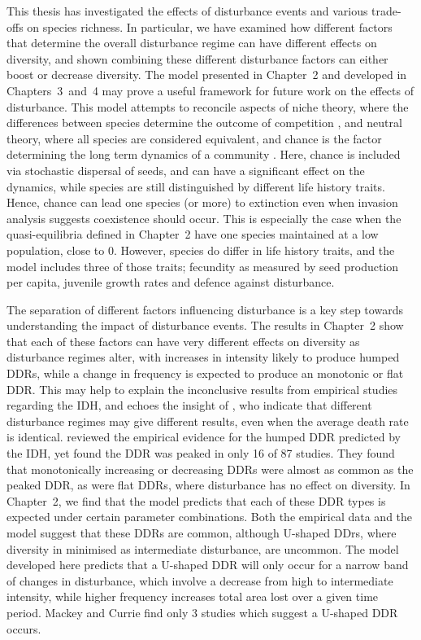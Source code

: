 This thesis has investigated the effects of disturbance events and various trade-offs on species richness. In particular, we have examined  how different factors that determine the overall disturbance regime can have different effects on diversity, and shown combining these different disturbance factors can either boost or decrease diversity. The model presented in Chapter~2 and developed in Chapters~3~and~4 may prove a useful framework for future work on the effects of disturbance. This model attempts to reconcile aspects of niche theory, where the differences between species determine the outcome of competition  \citep[e.g.][]{darwinorigin,tilman1980resources,tilman1991dynamics,tilman1994competition}, and neutral theory, where all species are considered equivalent, and chance is the factor determining the long term dynamics of a community  \citep[e.g.][]{hubbell1979tree,chave2004neutral,hubbell2001unified}. Here, chance is included via stochastic dispersal of seeds, and can have a significant effect on the dynamics, while species are still distinguished by different life history traits. Hence, chance can lead one species (or more) to extinction even when invasion analysis suggests coexistence should occur. This is especially the case when the quasi-equilibria defined in Chapter~2 have one species maintained at a low population, close to 0. However, species do differ in life history traits, and the model includes three of those traits; fecundity as measured by seed production per capita, juvenile growth rates and defence against disturbance.

The separation of different factors influencing disturbance is a key step towards understanding the impact of disturbance events. The results in Chapter~2 show that each of these factors can have very different effects on diversity as disturbance regimes alter, with increases in intensity likely to produce humped DDRs, while a change in frequency is expected to produce an monotonic or flat DDR. This may help to explain the inconclusive results from empirical studies regarding the IDH, and echoes the insight of \cite{miller2011frequency}, who indicate that different disturbance regimes may give different results, even when the average death rate is identical. \cite{mackey2001diversity} reviewed the empirical evidence for the humped DDR predicted by the IDH, yet found the DDR was peaked in only 16 of 87 studies. They found that monotonically increasing or decreasing DDRs were almost as common as the peaked DDR, as were flat DDRs, where disturbance has no effect on diversity. In Chapter~2, we find that the model predicts that each of these DDR types is expected under certain parameter combinations. Both the empirical data and the model suggest that these DDRs are common, although U-shaped DDrs, where diversity in minimised as intermediate disturbance, are uncommon. The model developed here predicts that a U-shaped DDR will only occur for a narrow band of changes in disturbance, which involve a decrease from high to intermediate intensity, while higher frequency increases total area lost over a given time period. Mackey and Currie find only 3 studies which suggest a U-shaped DDR occurs.

